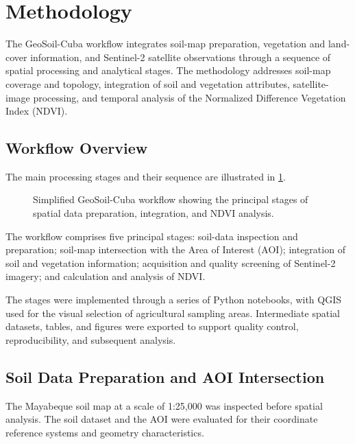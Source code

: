 \section{Methodology}
\label{sec:methodology}

The GeoSoil-Cuba workflow integrates soil-map
preparation, vegetation and land-cover information,
and Sentinel-2 satellite observations through a
sequence of spatial processing and analytical
stages. The methodology addresses soil-map
coverage and topology, integration of soil and
vegetation attributes, satellite-image processing,
and temporal analysis of the Normalized Difference
Vegetation Index (NDVI).

\subsection{Workflow Overview}
\label{subsec:workflow-overview}

The main processing stages and their sequence
are illustrated in \cref{fig:workflow}.

\begin{figure}[H]
	\centering
	
	\caption{
		Simplified GeoSoil-Cuba workflow showing
		the principal stages of spatial data
		preparation, integration, and NDVI analysis.
	}
	\label{fig:workflow}
\end{figure}

The workflow comprises five principal stages:
soil-data inspection and preparation; soil-map
intersection with the Area of Interest (AOI);
integration of soil and vegetation information;
acquisition and quality screening of Sentinel-2
imagery; and calculation and analysis of NDVI.

The stages were implemented through a series
of Python notebooks, with QGIS used for the
visual selection of agricultural sampling areas.
Intermediate spatial datasets, tables, and
figures were exported to support quality control,
reproducibility, and subsequent analysis.


\subsection{Soil Data Preparation and AOI Intersection}
\label{subsec:soil-preparation}

The Mayabeque soil map at a scale of 1:25,000
was inspected before spatial analysis. The soil
dataset and the AOI were evaluated for their
coordinate reference systems and geometry
characteristics.

